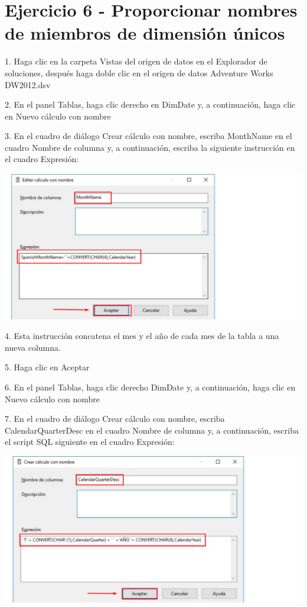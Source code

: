 \section{Ejercicio 6 - Proporcionar nombres de miembros de dimensión únicos}  

1. Haga clic en la carpeta Vistas del origen de datos en el Explorador de soluciones, después haga doble clic en el
origen de datos Adventure Works DW2012.dsv

2. En el panel Tablas, haga clic derecho en DimDate y, a continuación, haga clic en Nuevo cálculo con nombre

3. En el cuadro de diálogo Crear cálculo con nombre, escriba MonthName en el cuadro Nombre de columna y, a
continuación, escriba la siguiente instrucción en el cuadro Expresión:

	\begin{center}
	\includegraphics[width=\columnwidth]{images/task6/img1}
	\end{center}	

4. Esta instrucción concatena el mes y el año de cada mes de la tabla a una nueva columna.

5. Haga clic en Aceptar

6. En el panel Tablas, haga clic derecho DimDate y, a continuación, haga clic en Nuevo cálculo con nombre

7. En el cuadro de diálogo Crear cálculo con nombre, escriba CalendarQuarterDesc en el cuadro Nombre de
columna y, a continuación, escriba el script SQL siguiente en el cuadro Expresión:

	\begin{center}
	\includegraphics[width=\columnwidth]{images/task6/img2}
	\end{center}	

